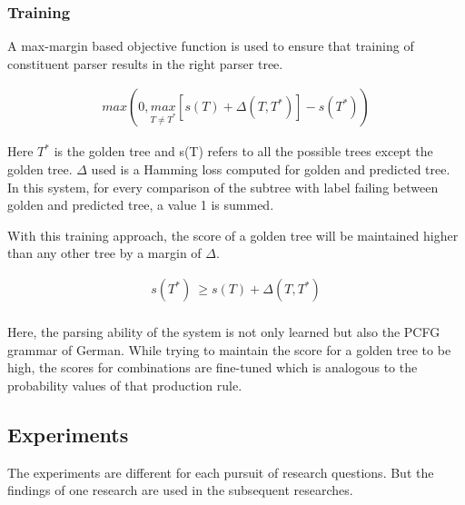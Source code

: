 \documentclass[a4paper, 11pt]{article}
\begin{document}
\subsubsection{Training}

A max-margin based objective function is used to ensure that training of constituent parser results in the right parser tree.

\begin{align*}
max\left(0, \underset{T\neq{T^*}}{max}\left[s(T) + \Delta(T,T^*)\right] - s(T^*)\right)
\end{align*}

Here $T^*$ is the golden tree and s(T) refers to all the possible trees except the golden tree. $\Delta$ used is a Hamming loss computed for golden and predicted tree. In this system, for every comparison of the subtree with label failing between golden and predicted tree, a value 1 is summed.

With this training approach, the score of a golden tree will be maintained higher than any other tree by a margin of $\Delta$.  

\begin{align*}
s(T^*)\ \geq s(T) + \Delta (T,T^*) \\
\end{align*}

Here, the parsing ability of the system is not only learned but also the PCFG grammar of German. While trying to maintain the score for a golden tree to be high, the scores for combinations are fine-tuned which is analogous to the probability values of that production rule.

\subsection{Experiments}

The experiments are different for each pursuit of research questions. But the findings of one research are used in the subsequent researches. 
\end{document}
